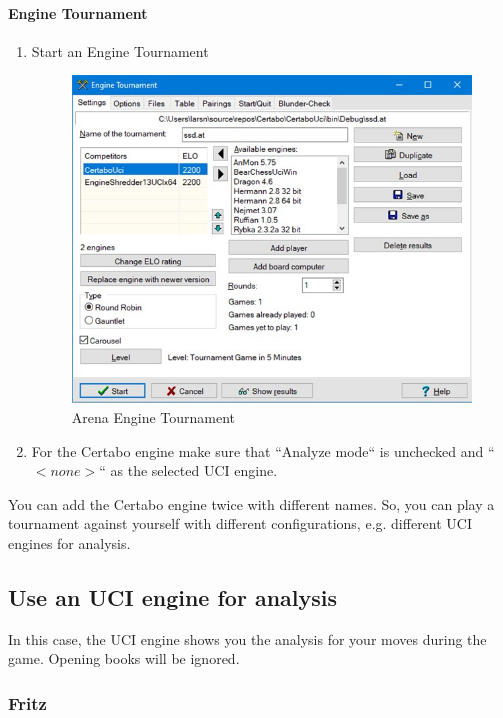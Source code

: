 \documentclass[11pt,a4paper]{article}
\begin{document}
\paragraph{Engine Tournament}
\begin{enumerate}
\item Start an Engine Tournament
  \begin{figure}[H]
	\centering
	\includegraphics[scale=0.5]{arena_enginetournament.jpg}
	\caption{Arena Engine Tournament}
	\label{fig:ArenaEngineTournament}
\end{figure}
\item For the Certabo engine make sure that ``Analyze mode`` is unchecked and  ``\begin{math} <none> \end{math}`` as the selected UCI engine.
\end{enumerate}
You can add the Certabo engine twice with different names. So, you can play a tournament against yourself with different configurations, e.g. different UCI engines for analysis.

\subsection{Use an UCI engine for analysis}
In this case, the UCI engine shows you the analysis for your moves during the game. Opening books will be ignored.
\subsubsection{Fritz}
\end{document}
